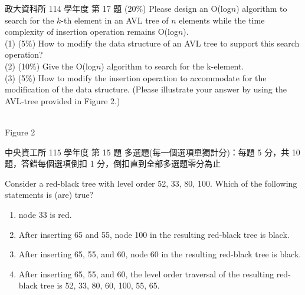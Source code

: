 \begin{pastexam}[label={px:bal-2}]{政大資科所 114 學年度 第 17 題}
(20\%) Please design an O(log$n$) algorithm to search for the $k$-th element in an AVL tree
of $n$ elements while the time complexity of insertion operation remains O(log$n$).\\
(1) (5\%) How to modify the data structure of an AVL tree to support this search operation?\\
(2) (10\%) Give the O(log$n$) algorithm to search for the k-element.\\
(3) (5\%) How to modify the insertion operation to accommodate for the modification of the
data structure. (Please illustrate your answer by using the AVL-tree provided in Figure 2.)
\begin{center}
\\
Figure 2
\end{center}
\end{pastexam}

\begin{pastexam}[label={px:bal-3}]{中央資工所 115 學年度 第 15 題}
多選題(每一個選項單獨計分)：每題 5 分，共 10 題，答錯每個選項倒扣 1 分，倒扣直到全部多選題零分為止

Consider a red-black tree with level order 52, 33, 80, 100. Which of the following
statements is (are) true?
\begin{enumerate}[label=\Alph*.]
\item node 33 is red.
\item After inserting 65 and 55, node 100 in the resulting red-black tree is black.
\item After inserting 65, 55, and 60, node 60 in the resulting red-black tree is black.
\item After inserting 65, 55, and 60, the level order traversal of the resulting red-black
tree is 52, 33, 80, 60, 100, 55, 65.
\end{enumerate}
\end{pastexam}

